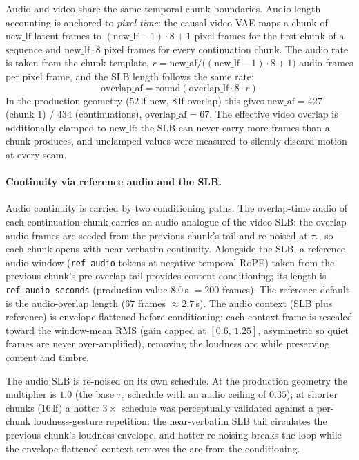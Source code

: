 \documentclass[12pt]{article}
\begin{document}
Audio and video share the same temporal chunk boundaries.  Audio length
accounting is anchored to \emph{pixel time}: the causal video VAE maps a
chunk of $\text{new\_lf}$ latent frames to $(\text{new\_lf}-1)\cdot 8+1$
pixel frames for the first chunk of a sequence and $\text{new\_lf}\cdot 8$
pixel frames for every continuation chunk.  The audio rate is taken from the
chunk template, $r = \text{new\_af} / \big((\text{new\_lf}-1)\cdot 8+1\big)$
audio frames per pixel frame, and the SLB length follows the same rate:
\begin{equation}
\text{overlap\_af} = \text{round}\!\left(\text{overlap\_lf}\cdot 8 \cdot r\right)
\end{equation}
In the production geometry ($52$\,lf new, $8$\,lf overlap) this gives
$\text{new\_af}=427$ (chunk 1) / $434$ (continuations), $\text{overlap\_af}=67$.
The effective video overlap is additionally clamped to $\text{new\_lf}$: the
SLB can never carry more frames than a chunk produces, and unclamped values
were measured to silently discard motion at every seam.

\paragraph{Continuity via reference audio and the SLB.}
Audio continuity is carried by two conditioning paths.  The overlap-time audio
of each continuation chunk carries an audio analogue of the video SLB: the
overlap audio frames are seeded from the previous chunk's tail and re-noised
at $\tau_c$, so each chunk opens with near-verbatim continuity.  Alongside
the SLB, a reference-audio window (\texttt{ref\_audio} tokens at negative
temporal RoPE) taken from the previous chunk's pre-overlap tail provides
content conditioning; its length is \texttt{ref\_audio\_seconds} (production
value $8.0$\,s $=200$ frames).  The reference default is the audio-overlap
length ($67$ frames $\approx2.7$\,s).  The audio context (SLB plus reference)
is envelope-flattened before conditioning: each context frame is rescaled
toward the window-mean RMS (gain capped at $[0.6,\,1.25]$, asymmetric so quiet
frames are never over-amplified), removing the loudness arc while preserving
content and timbre.

The audio SLB is re-noised on its own schedule.  At the production geometry
the multiplier is $1.0$ (the base $\tau_c$ schedule with an audio ceiling of
$0.35$); at shorter chunks ($16$\,lf) a hotter $3\times$ schedule was
perceptually validated against a per-chunk loudness-gesture repetition: the near-verbatim SLB tail circulates the previous chunk's
loudness envelope, and hotter re-noising breaks the loop while the
envelope-flattened context removes the arc from the conditioning.
\end{document}
